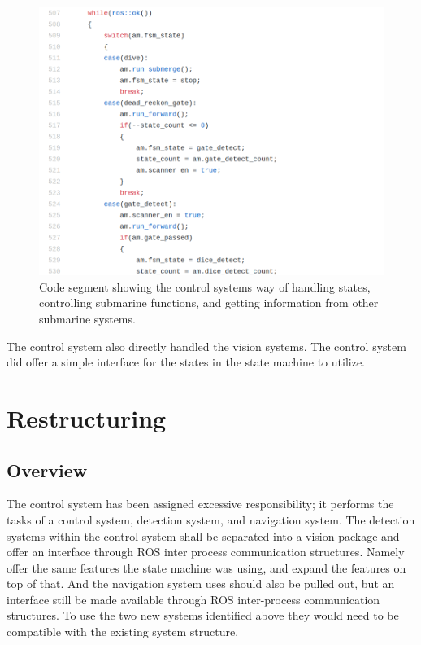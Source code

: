 \begin{figure}
\centering
\includegraphics[width=150mm]{Figures/DirectStateHandling}
\decoRule
\caption[Direct State Handling]{Code segment showing the control systems way of handling states, controlling submarine functions, and getting information from other submarine systems.}
\label{fig:DirectStateHandling}
\end{figure}

The control system also directly handled the vision systems. The control system did offer a simple interface for the states in the state machine to utilize.


\section{Restructuring}

\subsection{Overview}
The control system has been assigned excessive responsibility; it performs the
tasks of a control system, detection system, and navigation system.
The detection systems within the control system shall be separated into a vision
package and offer an interface through ROS inter process communication
structures.
Namely offer the same features the state machine was using, and expand the
features on top of that.
And the navigation system uses should also be pulled out, but an interface still
be made available through ROS inter-process communication structures.
To use the two new systems identified above they would need to be compatible
with the existing system structure.

